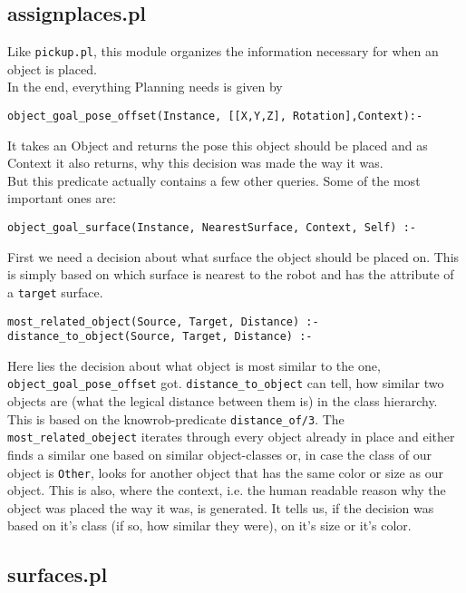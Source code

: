\documentclass[main.tex]{subfiles}
\begin{document}
\subsection{assignplaces.pl}

Like \texttt{pickup.pl}, this module organizes the information necessary for when an object is placed.\\

In the end, everything Planning needs is given by
\begin{lstlisting}
object_goal_pose_offset(Instance, [[X,Y,Z], Rotation],Context):-
\end{lstlisting}
It takes an Object and returns the pose this object should be placed and as Context it also returns, why this decision was made the way it was.\\
But this predicate actually contains a few other queries. Some of the most important ones are:

\begin{lstlisting}
object_goal_surface(Instance, NearestSurface, Context, Self) :-
\end{lstlisting}
First we need a decision about what surface the object should be placed on. This is simply based on which surface is nearest to the robot and has the attribute of a \texttt{target} surface.
\begin{lstlisting}
most_related_object(Source, Target, Distance) :-
distance_to_object(Source, Target, Distance) :-
\end{lstlisting}

Here lies the decision about what object is most similar to the one, \texttt{object\_goal\_pose\_offset} got. \texttt{distance\_to\_object} can tell, how similar two objects are (what the legical distance between them is) in the class hierarchy. This is based on the knowrob-predicate \texttt{distance\_of/3}. The \texttt{most\_related\_obeject} iterates through every object already in place and either finds a similar one based on similar object-classes or, in case the class of our object is \texttt{Other}, looks for another object that has the same color or size as our object. This is also, where the context, i.e. the human readable reason why the object was placed the way it was, is generated. It tells us, if the decision was based on it's class (if so, how similar they were), on it's size or it's color.

\subsection{surfaces.pl}
\end{document}
